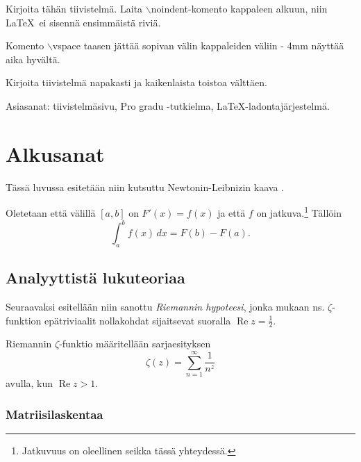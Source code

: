 
\vspace{4mm}\noindent Kirjoita tähän tiivistelmä. Laita $\backslash${noindent}-komento kappaleen
alkuun, niin \LaTeX\, ei sisennä ensimmäistä riviä.

\vspace{4mm}\noindent Komento $\backslash$vspace taasen jättää sopivan välin kappaleiden väliin - 4mm näyttää aika hyvältä.

\vspace{4mm}\noindent Kirjoita tiivistelmä napakasti ja kaikenlaista toistoa välttäen.

\vspace{4mm}\noindent Asiasanat: tiivistelmäsivu, Pro gradu -tutkielma, \LaTeX-ladontajärjestelmä.



\newpage\null
\tableofcontents



\newpage\null
\pagestyle{plain} 

\section{Alkusanat}

Tässä luvussa esitetään niin kutsuttu Newtonin-Leibnizin kaava \cite{NewtLeib}.

\begin{theorem} Oletetaan että välillä $[a,b]$ on $F'(x)=f(x)$ ja että $f$ on jatkuva.\footnote{Jatkuvuus on oleellinen seikka tässä yhteydessä.} Tällöin
\[
\int_a^bf(x)\,dx=F(b)-F(a).
\]
\end{theorem}

\subsection{Analyyttistä lukuteoriaa}

Seuraavaksi esitellään niin sanottu {\em Riemannin hypoteesi}, jonka mukaan ns. $\zeta$-funktion epätriviaalit nollakohdat sijaitsevat suoralla $\operatorname{Re}z=\frac12$.
\begin{definition} Riemannin $\zeta$-funktio määritellään sarjaesityksen \cite{Riemann}
\[
\zeta(z)=\sum_{n=1}^{\infty}\frac{1}{n^z}
\]
avulla, kun $\operatorname{Re}z>1$.
\end{definition}

\subsubsection{Matriisilaskentaa}

